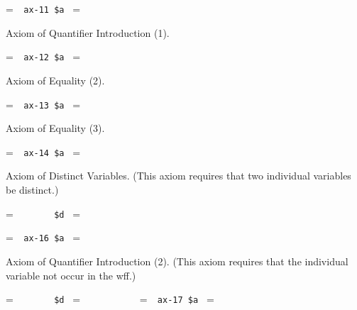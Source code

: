 \setbox\startprefix=\hbox{\tt \ \ ax-11\ \$a\ }
\setbox\contprefix=\hbox{\tt \ \ \ \ \ \ \ \ \ \ \ }
\startm
\m{\vdash}\m{(}\m{\lnot}\m{\forall}\m{=}\m{\rightarrow}\m{(}
\m{=}\m{\rightarrow}\m{(}\m{\varphi}\m{\rightarrow}\m{\forall}\m{(}
\m{=}\m{\rightarrow}\m{\varphi}\m{)}\m{)}\m{)}\m{)}
\endm

\noindent Axiom of Quantifier Introduction (1).

\setbox\startprefix=\hbox{\tt \ \ ax-12\ \$a\ }
\setbox\contprefix=\hbox{\tt \ \ \ \ \ \ \ \ \ \ \ }
\startm
\m{\vdash}\m{(}\m{\lnot}\m{\forall}\m{=}\m{\rightarrow}\m{(}
\m{\lnot}\m{\forall}\m{=}\m{\rightarrow}\m{(}\m{=}
\m{\rightarrow}\m{\forall}\m{=}\m{)}\m{)}\m{)}
\endm

\noindent Axiom of Equality (2).

\setbox\startprefix=\hbox{\tt \ \ ax-13\ \$a\ }
\setbox\contprefix=\hbox{\tt \ \ \ \ \ \ \ \ \ \ \ }
\startm
\m{\vdash}\m{(}\m{=}\m{\rightarrow}\m{(}\m{\in}\m{
\rightarrow}\m{\in}\m{)}\m{)}
\endm

\noindent Axiom of Equality (3).

\setbox\startprefix=\hbox{\tt \ \ ax-14\ \$a\ }
\setbox\contprefix=\hbox{\tt \ \ \ \ \ \ \ \ \ \ \ }
\startm
\m{\vdash}\m{(}\m{=}\m{\rightarrow}\m{(}\m{\in}\m{
\rightarrow}\m{\in}\m{)}\m{)}
\endm

\noindent Axiom of Distinct Variables.  (This axiom requires
that two individual variables
be distinct.)

\setbox\startprefix=\hbox{\tt \ \ \ \ \ \ \ \ \$d\ }
\setbox\contprefix=\hbox{\tt \ \ \ \ \ \ \ \ \ \ \ }
\startm
{}\m{\,}
\endm

\setbox\startprefix=\hbox{\tt \ \ ax-16\ \$a\ }
\setbox\contprefix=\hbox{\tt \ \ \ \ \ \ \ \ \ \ \ }
\startm
\m{\vdash}\m{(}\m{\forall}\m{=}\m{\rightarrow}\m{(}\m{\varphi}\m{
\rightarrow}\m{\forall}\m{\varphi}\m{)}\m{)}
\endm

\noindent Axiom of Quantifier Introduction (2).  (This axiom requires
that the individual variable not occur in the
wff.)

\setbox\startprefix=\hbox{\tt \ \ \ \ \ \ \ \ \$d\ }
\setbox\contprefix=\hbox{\tt \ \ \ \ \ \ \ \ \ \ \ }
\startm
{}\m{\,}\m{\varphi}
\endm
\setbox\startprefix=\hbox{\tt \ \ ax-17\ \$a\ }
\setbox\contprefix=\hbox{\tt \ \ \ \ \ \ \ \ \ \ \ }
\startm
\m{\vdash}\m{(}\m{\varphi}\m{\rightarrow}\m{\forall}\m{\varphi}\m{)}
\endm


